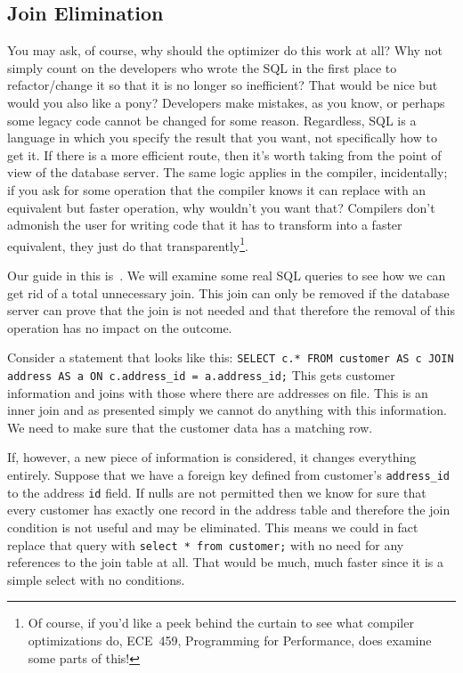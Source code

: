 \documentclass[a4paper]{report}
\begin{document}
\subsection*{Join Elimination}

You may ask, of course, why should the optimizer do this work at all? Why not simply count on the developers who wrote the SQL in the first place to refactor/change it so that it is no longer so inefficient? That would be nice but would you also like a pony?  Developers make mistakes, as you know, or perhaps some legacy code cannot be changed for some reason. Regardless, SQL is a language in which you specify the result that you want, not specifically how to get it. If there is a more efficient route, then it's worth taking from the point of view of the database server. The same logic applies in the compiler, incidentally; if you ask for some operation that the compiler knows it can replace with an equivalent but faster operation, why wouldn't you want that? Compilers don't admonish the user for writing code that it has to transform into a faster equivalent, they just do that transparently\footnote{Of course, if you'd like a peek behind the curtain to see what compiler optimizations do, ECE~459, Programming for Performance, does examine some parts of this!}.

Our guide in this is~\cite{joinelim}. We will examine some real SQL queries to see how we can get rid of a total unnecessary join. This join can only be removed if the database server can prove that the join is not needed and that therefore the removal of this operation has no impact on the outcome.


Consider a statement that looks like this: \texttt{SELECT c.* FROM customer AS c JOIN address AS a ON c.address\_id = a.address\_id;} This gets customer information and joins with those where there are addresses on file. This is an inner join and as presented simply we cannot do anything with this information. We need to make sure that the customer data has a matching row.

If, however, a new piece of information is considered, it changes everything entirely. Suppose that we have a foreign key defined from customer's \texttt{address\_id} to the address \texttt{id} field. If nulls are not permitted then we know for sure that every customer has exactly one record in the address table and therefore the join condition is not useful and may be eliminated. This means we could in fact replace that query with \texttt{select * from customer;} with no need for any references to the join table at all. That would be much, much faster since it is a simple select with no conditions.
\end{document}
